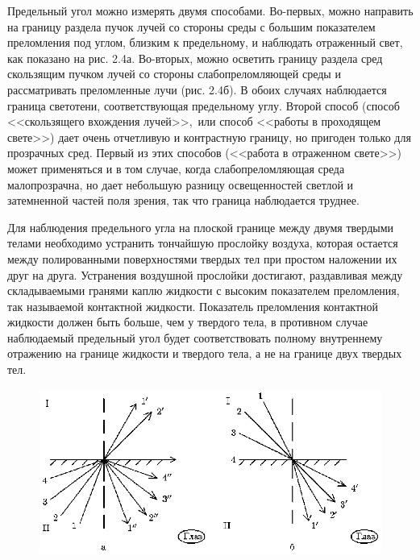 Предельный угол можно измерять двумя способами. Во-первых, можно
направить на границу раздела пучок лучей со стороны среды с
большим показателем преломления под углом, близким к предельному,
и наблюдать отраженный свет, как показано на рис. 2.4а. Во-вторых,
можно осветить границу раздела сред скользящим пучком лучей со
стороны слабопреломляющей среды и рассматривать преломленные лучи
(рис. 2.4б). В обоих случаях наблюдается граница светотени,
соответствующая предельному углу. Второй способ (способ <<скользящего вхождения лучей>>,\ или способ <<работы в проходящем
свете>>) дает очень отчетливую и контрастную границу, но пригоден
только для прозрачных сред. Первый из этих способов (<<работа в
отраженном свете>>) может применяться и в том случае, когда
слабопреломляющая среда малопрозрачна, но дает небольшую разницу
освещенностей светлой и затемненной частей поля зрения, так что
граница наблюдается труднее.

Для наблюдения предельного угла на плоской границе между двумя
твердыми телами необходимо устранить тончайшую прослойку воздуха,
которая остается между полированными поверхностями твердых тел при
простом наложении их друг на друга. Устранения воздушной прослойки
достигают, раздавливая между складываемыми гранями каплю жидкости
с высоким показателем преломления, так называемой контактной
жидкости. Показатель преломления контактной жидкости должен быть
больше, чем у твердого тела, в противном случае наблюдаемый
предельный угол будет соответствовать полному внутреннему
отражению на границе жидкости и твердого тела, а не на границе
двух твердых тел.

\begin{figure}[tbp]
\centerline{\hbox{\includegraphics[scale=1]{Ris/ris_eps/ris2_04.eps}}}


\end{figure}

